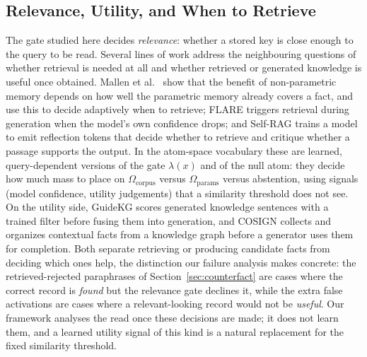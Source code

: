 \documentclass[preprint,12pt]{elsarticle}
\newcommand{\Om}{\Omega}
\providecommand{\DIFaddend}{} %
\DeclareRobustCommand{\DIFaddend}{\DIFOaddend \let\includegraphics\DIFOincludegraphics} %
\begin{document}
\DIFaddend \subsection{Relevance, Utility, and When to Retrieve}
The gate studied here decides \emph{relevance}: whether a stored key is close enough to the query to be read. Several lines of work address the neighbouring questions of whether retrieval is needed at all and whether retrieved or generated knowledge is useful once obtained. Mallen et al.\ \cite{mallen2023trust} show that the benefit of non-parametric memory depends on how well the parametric memory already covers a fact, and use this to decide adaptively when to retrieve; FLARE \cite{jiang2023active} triggers retrieval during generation when the model's own confidence drops; and Self-RAG \cite{asai2024selfrag} trains a model to emit reflection tokens that decide whether to retrieve and critique whether a passage supports the output. In the atom-space vocabulary these are learned, query-dependent versions of the gate $\lambda(x)$ and of the null atom: they decide how much mass to place on $\Om_{\mathrm{corpus}}$ versus $\Om_{\mathrm{params}}$ versus abstention, using signals (model confidence, utility judgements) that a similarity threshold does not see. On the utility side, GuideKG \cite{wei2024guidekg} scores generated knowledge sentences with a trained filter before fusing them into generation, and COSIGN \cite{li2024cosign} collects and organizes contextual facts from a knowledge graph before a generator uses them for completion. Both separate retrieving or producing candidate facts from deciding which ones help, the distinction our failure analysis makes concrete: the retrieved-rejected paraphrases of Section~\ref{sec:counterfact} are cases where the correct record is \emph{found} but the relevance gate declines it, while the extra false activations are cases where a relevant-looking record would not be \emph{useful}. Our framework analyses the read once these decisions are made; it does not learn them, and a learned utility signal of this kind is a natural replacement for the fixed similarity threshold.
\end{document}
